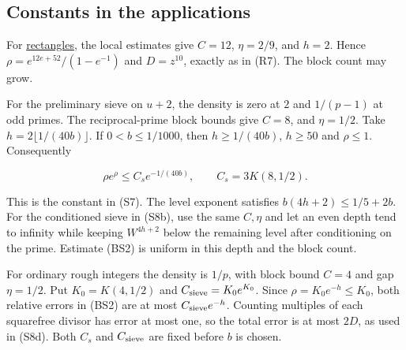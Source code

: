 
\hypertarget{block-sieve-constants-in-the-applications}{%
\subsection{Constants in the
applications}\label{block-sieve-constants-in-the-applications}}

For \protect\hyperlink{rectangles}{rectangles}, the local estimates give
\(C=12\), \(\eta=2/9\), and \(h=2\). Hence
\(\rho=e^{12e+52}/(1-e^{-1})\) and \(D=z^{10}\), exactly as in (R7). The
block count may grow.

For the preliminary sieve on \(u+2\), the density is zero at \(2\) and
\(1/(p-1)\) at odd primes. The reciprocal-prime block bounds give
\(C=8\), and \(\eta=1/2\). Take \(h=2\lfloor1/(40b)\rfloor\). If
\(0<b\le1/1000\), then \(h\ge1/(40b)\), \(h\ge50\) and \(\rho\le1\).
Consequently

\[
\rho e^\rho\le C_s e^{-1/(40b)},\qquad C_s=3K(8,1/2).
\]

This is the constant in (S7). The level exponent satisfies
\(b(4h+2)\le1/5+2b\). For the conditioned sieve in (S8b), use the same
\(C,\eta\) and let an even depth tend to infinity while keeping
\(W^{4h+2}\) below the remaining level after conditioning on the prime.
Estimate (BS2) is uniform in this depth and the block count.

For ordinary rough integers the density is \(1/p\), with block bound
\(C=4\) and gap \(\eta=1/2\). Put \(K_0=K(4,1/2)\) and
\(C_{\rm sieve}=K_0e^{K_0}\). Since \(\rho=K_0e^{-h}\le K_0\), both
relative errors in (BS2) are at most \(C_{\rm sieve}e^{-h}\). Counting
multiples of each squarefree divisor has error at most one, so the total
error is at most \(2D\), as used in (S8d). Both \(C_s\) and
\(C_{\rm sieve}\) are fixed before \(b\) is chosen.
